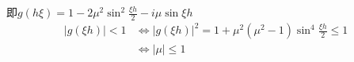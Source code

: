 \documentclass[UTF8]{ctexart}
\begin{document}
即$g(h\xi) = 1 - 2\mu^2\sin^2\frac{\xi h}{2} - i\mu\sin\xi h$
\begin{equation}
    \label{eq:12.97-F-3}
    \begin{aligned}
        |g(\xi h) | < 1 &\Leftrightarrow  |g(\xi h)|^2 = 1 + \mu^2(\mu^2-1)\sin^4\frac{\xi h}{2} \leq 1 \\
                        &\Leftrightarrow  |\mu| \leq  1
    \end{aligned}
\end{equation}









\end{document}
